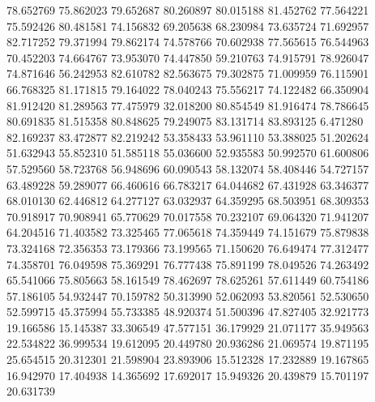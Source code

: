 78.652769
75.862023
79.652687
80.260897
80.015188
81.452762
77.564221
75.592426
80.481581
74.156832
69.205638
68.230984
73.635724
71.692957
82.717252
79.371994
79.862174
74.578766
70.602938
77.565615
76.544963
70.452203
74.664767
73.953070
74.447850
59.210763
74.915791
78.926047
74.871646
56.242953
82.610782
82.563675
79.302875
71.009959
76.115901
66.768325
81.171815
79.164022
78.040243
75.556217
74.122482
66.350904
81.912420
81.289563
77.475979
32.018200
80.854549
81.916474
78.786645
80.691835
81.515358
80.848625
79.249075
83.131714
83.893125
6.471280
82.169237
83.472877
82.219242
53.358433
53.961110
53.388025
51.202624
51.632943
55.852310
51.585118
55.036600
52.935583
50.992570
61.600806
57.529560
58.723768
56.948696
60.090543
58.132074
58.408446
54.727157
63.489228
59.289077
66.460616
66.783217
64.044682
67.431928
63.346377
68.010130
62.446812
64.277127
63.032937
64.359295
68.503951
68.309353
70.918917
70.908941
65.770629
70.017558
70.232107
69.064320
71.941207
64.204516
71.403582
73.325465
77.065618
74.359449
74.151679
75.879838
73.324168
72.356353
73.179366
73.199565
71.150620
76.649474
77.312477
74.358701
76.049598
75.369291
76.777438
75.891199
78.049526
74.263492
65.541066
75.805663
58.161549
78.462697
78.625261
57.611449
60.754186
57.186105
54.932447
70.159782
50.313990
52.062093
53.820561
52.530650
52.599715
45.375994
55.733385
48.920374
51.500396
47.827405
32.921773
19.166586
15.145387
33.306549
47.577151
36.179929
21.071177
35.949563
22.534822
36.999534
19.612095
20.449780
20.936286
21.069574
19.871195
25.654515
20.312301
21.598904
23.893906
15.512328
17.232889
19.167865
16.942970
17.404938
14.365692
17.692017
15.949326
20.439879
15.701197
20.631739

